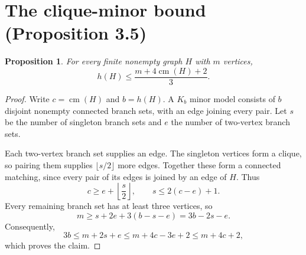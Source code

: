 \documentclass[11pt]{article}
\newtheorem{proposition}{Proposition}
\newcommand{\cm}{\operatorname{cm}}
\begin{document}
\appendix
\section{The clique-minor bound (Proposition 3.5)}
\label{app:minor-bound}

\begin{proposition}
For every finite nonempty graph $H$ with $m$ vertices,
\[
h(H)\le \frac{m+4\cm(H)+2}{3}.
\]
\end{proposition}

\begin{proof}
Write $c=\cm(H)$ and $b=h(H)$. A $K_b$ minor model consists of $b$ disjoint nonempty connected branch sets, with an edge joining every pair. Let $s$ be the number of singleton branch sets and $e$ the number of two-vertex branch sets.

Each two-vertex branch set supplies an edge. The singleton vertices form a clique, so pairing them supplies $\lfloor s/2\rfloor$ more edges. Together these form a connected matching, since every pair of its edges is joined by an edge of $H$. Thus
\[
c\ge e+\left\lfloor\frac{s}{2}\right\rfloor,
\qquad s\le2(c-e)+1.
\]
Every remaining branch set has at least three vertices, so
\[
m\ge s+2e+3(b-s-e)=3b-2s-e.
\]
Consequently,
\[
3b\le m+2s+e\le m+4c-3e+2\le m+4c+2,
\]
which proves the claim.
\end{proof}
\end{document}
